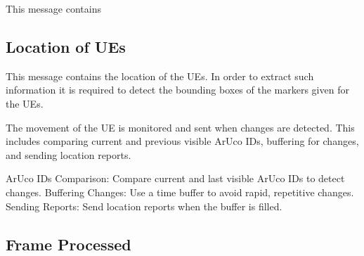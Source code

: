 This message contains

\subsection{Location of UEs}

\begin{table}[H]
    \caption{Components of the UE Location Message payload}
    \label{tab:ue_payload}
    \centering
\end{table}


This message contains the location of the UEs. In order to extract such information it is required to detect the bounding boxes of the markers given for the UEs. 

The movement of the UE is monitored and sent when changes are detected.
This includes comparing current and previous visible ArUco IDs, buffering for changes, and sending location reports.

    ArUco IDs Comparison:
        Compare current and last visible ArUco IDs to detect changes.
    Buffering Changes:
        Use a time buffer to avoid rapid, repetitive changes.
    Sending Reports:
        Send location reports when the buffer is filled.

\subsection{Frame Processed}

\begin{table}[H]
    \caption{Components of the Frame Processed Message payload}
    \label{tab:frame_proc_pay}
    \centering
\end{table}



